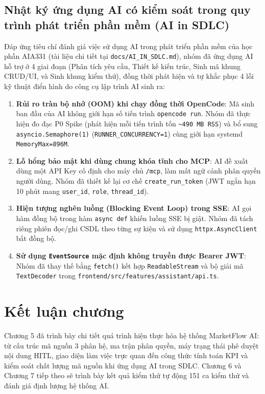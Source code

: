 \subsection{Nhật ký ứng dụng AI có kiểm soát trong quy trình phát triển phần mềm (AI in SDLC)}
Đáp ứng tiêu chí đánh giá việc sử dụng AI trong phát triển phần mềm của học phần AIA331 (tài liệu chi tiết tại \texttt{docs/AI\_IN\_SDLC.md}), nhóm đã ứng dụng AI hỗ trợ ở 4 giai đoạn (Phân tích yêu cầu, Thiết kế kiến trúc, Sinh mã khung CRUD/UI, và Sinh khung kiểm thử), đồng thời phát hiện và tự khắc phục 4 lỗi kỹ thuật điển hình do công cụ lập trình AI sinh ra:
\begin{enumerate}[noitemsep,topsep=2pt]
 \item \textbf{Rủi ro tràn bộ nhớ (OOM) khi chạy đồng thời OpenCode}: Mã sinh ban đầu của AI không giới hạn số tiến trình \texttt{opencode run}. Nhóm đã thực hiện đo đạc P0 Spike (phát hiện mỗi tiến trình tốn \texttt{\~{}490 MB RSS}) và bổ sung \texttt{asyncio.Semaphore(1)} (\texttt{RUNNER\_CONCURRENCY=1}) cùng giới hạn systemd \texttt{MemoryMax=896M}.
 \item \textbf{Lỗ hổng bảo mật khi dùng chung khóa tĩnh cho MCP}: AI đề xuất dùng một API Key cố định cho máy chủ \texttt{/mcp}, làm mất ngữ cảnh phân quyền người dùng. Nhóm đã thiết kế lại cơ chế \texttt{create\_run\_token} (JWT ngắn hạn 10 phút mang \texttt{user\_id}, \texttt{role}, \texttt{thread\_id}).
 \item \textbf{Hiện tượng nghẽn luồng (Blocking Event Loop) trong SSE}: AI gọi hàm đồng bộ trong hàm \texttt{async def} khiến luồng SSE bị giật. Nhóm đã tách riêng phiên đọc/ghi CSDL theo từng sự kiện và sử dụng \texttt{httpx.AsyncClient} bất đồng bộ.
 \item \textbf{Sử dụng \texttt{EventSource} mặc định không truyền được Bearer JWT}: Nhóm đã thay thế bằng \texttt{fetch()} kết hợp \texttt{ReadableStream} và bộ giải mã \texttt{TextDecoder} trong \texttt{frontend/src/features/assistant/api.ts}.
\end{enumerate}

\section{Kết luận chương}

Chương 5 đã trình bày chi tiết quá trình hiện thực hóa hệ thống MarketFlow AI: từ cấu trúc mã nguồn 3 phân hệ, ma trận phân quyền, máy trạng thái phê duyệt nội dung HITL, giao diện làm việc trực quan đến công thức tính toán KPI và kiểm soát chất lượng mã nguồn khi ứng dụng AI trong SDLC. Chương 6 và Chương 7 tiếp theo sẽ trình bày kết quả kiểm thử tự động 151 ca kiểm thử và đánh giá định lượng hệ thống AI.
